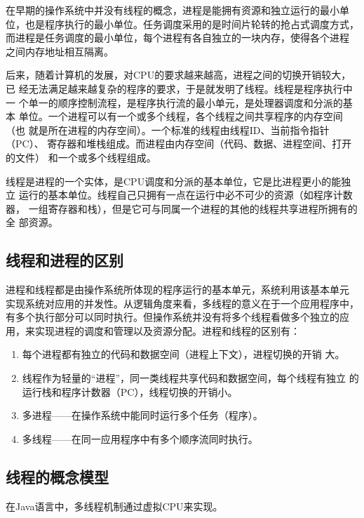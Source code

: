 \sline

在早期的操作系统中并没有线程的概念，进程是能拥有资源和独立运行的最小单
位，也是程序执行的最小单位。任务调度采用的是时间片轮转的抢占式调度方式，
而进程是任务调度的最小单位，每个进程有各自独立的一块内存，使得各个进程
之间内存地址相互隔离。

后来，随着计算机的发展，对CPU的要求越来越高，进程之间的切换开销较大，已
经无法满足越来越复杂的程序的要求，于是就发明了线程。线程是程序执行中一
个单一的顺序控制流程，是程序执行流的最小单元，是处理器调度和分派的基本
单位。一个进程可以有一个或多个线程，各个线程之间共享程序的内存空间（也
就是所在进程的内存空间）。一个标准的线程由线程ID、当前指令指针（PC）、
寄存器和堆栈组成。而进程由内存空间（代码、数据、进程空间、打开的文件）
和一个或多个线程组成。

线程是进程的一个实体，是CPU调度和分派的基本单位，它是比进程更小的能独立
运行的基本单位。线程自己只拥有一点在运行中必不可少的资源（如程序计数器，
一组寄存器和栈），但是它可与同属一个进程的其他的线程共享进程所拥有的全
部资源。

\sline

\subsection{线程和进程的区别}

进程和线程都是由操作系统所体现的程序运行的基本单元，系统利用该基本单元
实现系统对应用的并发性。从逻辑角度来看，多线程的意义在于一个应用程序中，
有多个执行部分可以同时执行。但操作系统并没有将多个线程看做多个独立的应
用，来实现进程的调度和管理以及资源分配。进程和线程的区别有：

\begin{enumerate}
\item 每个进程都有独立的代码和数据空间（进程上下文），进程切换的开销
  大。
\item 线程作为轻量的“进程”，同一类线程共享代码和数据空间，每个线程有独立
  的运行栈和程序计数器（PC），线程切换的开销小。
\item 多进程——在操作系统中能同时运行多个任务（程序）。
\item 多线程——在同一应用程序中有多个顺序流同时执行。
\end{enumerate}

\subsection{线程的概念模型}

在Java语言中，多线程机制通过虚拟CPU来实现。

